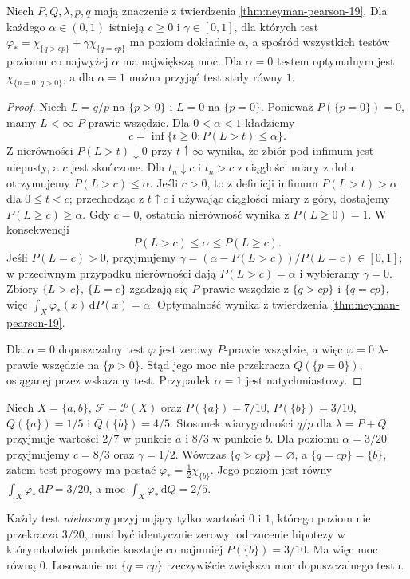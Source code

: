 \begin{wniosek}
\label{cor:NP-exact-alpha-19}
Niech $P,Q,\lambda,p,q$ mają znaczenie z twierdzenia
\ref{thm:neyman-pearson-19}. Dla każdego
$\alpha\in(0,1)$ istnieją $c\ge0$ i
$\gamma\in[0,1]$, dla których test
$\varphi_*=\chi_{\{q>cp\}}+\gamma\chi_{\{q=cp\}}$
ma poziom dokładnie $\alpha$, a spośród wszystkich
testów poziomu co najwyżej $\alpha$ ma największą moc.
Dla $\alpha=0$ testem optymalnym jest
$\chi_{\{p=0,\,q>0\}}$, a dla $\alpha=1$
można przyjąć test stały równy $1$.
\end{wniosek}
\begin{proof}
Niech $L=q/p$ na $\{p>0\}$ i $L=0$ na $\{p=0\}$.
Ponieważ $P(\{p=0\})=0$, mamy $L<\infty$
$P$-prawie wszędzie. Dla $0<\alpha<1$ kładziemy
\[
 c=\inf\{t\ge0:P(L>t)\le\alpha\}.
\]
Z nierówności $P(L>t)\downarrow0$ przy $t\uparrow\infty$
wynika, że zbiór pod infimum jest niepusty, a $c$ jest
skończone. Dla $t_n\downarrow c$ i $t_n>c$ z ciągłości
miary z dołu otrzymujemy $P(L>c)\le\alpha$.
Jeśli $c>0$, to z definicji infimum
$P(L>t)>\alpha$ dla $0\le t<c$;
przechodząc z $t\uparrow c$ i używając ciągłości miary
z góry, dostajemy $P(L\ge c)\ge\alpha$.
Gdy $c=0$, ostatnia nierówność wynika z
$P(L\ge0)=1$.
W konsekwencji
\[
 P(L>c)\le\alpha\le P(L\ge c).
\]
Jeśli $P(L=c)>0$, przyjmujemy
$\gamma=(\alpha-P(L>c))/P(L=c)\in[0,1]$;
w przeciwnym przypadku nierówności dają
$P(L>c)=\alpha$ i wybieramy $\gamma=0$.
Zbiory $\{L>c\}$, $\{L=c\}$ zgadzają się
$P$-prawie wszędzie z $\{q>cp\}$ i $\{q=cp\}$,
więc $\int_X\varphi_*(x)\,\mathrm dP(x)=\alpha$.
Optymalność wynika z twierdzenia
\ref{thm:neyman-pearson-19}.

Dla $\alpha=0$ dopuszczalny test $\varphi$ jest zerowy
$P$-prawie wszędzie, a więc $\varphi=0$
$\lambda$-prawie wszędzie na $\{p>0\}$.
Stąd jego moc nie przekracza
$Q(\{p=0\})$, osiąganej przez wskazany test.
Przypadek $\alpha=1$ jest natychmiastowy.
\end{proof}

\begin{przyklad}
\label{ex:np-randomization-19}
Niech $X=\{a,b\}$, $\mathcal F=\mathcal P(X)$ oraz
$P(\{a\})=7/10$, $P(\{b\})=3/10$,
$Q(\{a\})=1/5$ i $Q(\{b\})=4/5$.
Stosunek wiarygodności $q/p$ dla $\lambda=P+Q$
przyjmuje wartości $2/7$ w punkcie $a$ i $8/3$
w punkcie $b$. Dla poziomu $\alpha=3/20$
przyjmujemy $c=8/3$ oraz $\gamma=1/2$.
Wówczas $\{q>cp\}=\varnothing$, a $\{q=cp\}=\{b\}$,
zatem test progowy ma postać
$\varphi_*=\frac12\chi_{\{b\}}$. Jego poziom jest
równy $\int_X\varphi_*\,\mathrm dP=3/20$, a moc
$\int_X\varphi_*\,\mathrm dQ=2/5$.

Każdy test \emph{nielosowy} przyjmujący tylko wartości
$0$ i $1$, którego poziom nie przekracza $3/20$,
musi być identycznie zerowy: odrzucenie hipotezy
w którymkolwiek punkcie kosztuje co najmniej
$P(\{b\})=3/10$. Ma więc moc równą $0$.
Losowanie na $\{q=cp\}$ rzeczywiście zwiększa
moc dopuszczalnego testu.
\end{przyklad}


